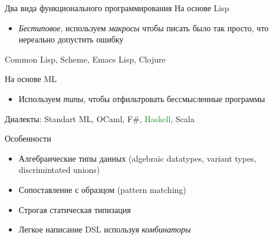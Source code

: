 \documentclass{beamer}
\def\faQuestionSign{{\FA\symbol{"F059}}}
\begin{document}
% 
% 
% 
% 

\begin{frame}{Два вида функционального программирования}
На основе Lisp
\begin{itemize}
 \item \emph{Бестиповое}, используем \emph{макросы} чтобы писать было так просто, что нереально допустить ошибку
\end{itemize}
\vspace{0.5cm}
Common Lisp, Scheme, Emacs Lisp, Clojure

\vspace{1cm}\pause
На основе ML
\begin{itemize}
 \item Используем \emph{типы}, чтобы отфильтровать бессмысленные программы
\end{itemize}
\vspace{0.5cm}
Диалекты: Standart ML, OCaml, F\#, \textcolor{ForestGreen}{Haskell}, Scala

\end{frame}

\begin{frame}{Особенности}
\begin{itemize}
 \item Алгебраические типы данных (algebraic datatypes, variant types, discrimintated unions)
 \item Сопоставление с образцом (pattern matching)
 \item Строгая статическая типизация
 \item Легкое  написание DSL используя \emph{комбинаторы}
\end{itemize}
\end{frame}
\end{document}
